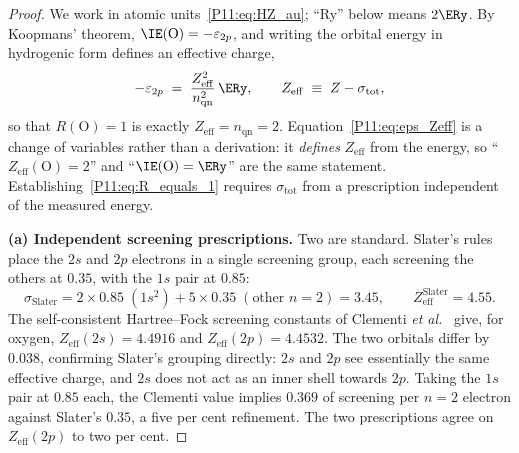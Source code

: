 

\begin{proof}
We work in atomic units~\eqref{P11:eq:HZ_au}; ``Ry'' below means $2\ERy$.
By Koopmans' theorem, $\IE(\mathrm{O}) = -\varepsilon_{2p}$, and writing
the orbital energy in hydrogenic form defines an effective charge,
\begin{equation}
  -\varepsilon_{2p}
  \;=\; \frac{Z_\mathrm{eff}^2}{n_\mathrm{qn}^2}\,\ERy,
  \qquad
  Z_\mathrm{eff} \;\equiv\; Z - \sigma_\mathrm{tot},
  \label{P11:eq:eps_Zeff}
\end{equation}
so that $R(\mathrm{O})=1$ is exactly $Z_\mathrm{eff}=n_\mathrm{qn}=2$.
Equation~\eqref{P11:eq:eps_Zeff} is a change of variables rather than a
derivation: it \emph{defines} $Z_\mathrm{eff}$ from the energy, so
``$Z_\mathrm{eff}(\mathrm{O})=2$'' and ``$\IE(\mathrm{O})=\ERy$'' are
the same statement.  Establishing~\eqref{P11:eq:R_equals_1} requires
$\sigma_\mathrm{tot}$ from a prescription independent of the measured
energy.

\textbf{(a) Independent screening prescriptions.}
Two are standard.  Slater's rules~\cite{Slater1930} place the $2s$ and
$2p$ electrons in a single screening group, each screening the others
at $0.35$, with the $1s$ pair at $0.85$:
\begin{equation}
  \sigma_\mathrm{Slater}
  = 2\times0.85\;(1s^2) + 5\times0.35\;(\text{other } n{=}2)
  = 3.45,
  \qquad
  Z_\mathrm{eff}^\mathrm{Slater} = 4.55 .
  \label{P11:eq:sigma_slater}
\end{equation}
The self-consistent Hartree--Fock screening constants of Clementi
\emph{et al.}~\cite{Clementi1963} give, for oxygen,
$Z_\mathrm{eff}(2s)=4.4916$ and $Z_\mathrm{eff}(2p)=4.4532$.  The two
orbitals differ by $0.038$, confirming Slater's grouping directly: $2s$
and $2p$ see essentially the same effective charge, and $2s$ does not
act as an inner shell towards $2p$.  Taking the $1s$ pair at $0.85$
each, the Clementi value implies $0.369$ of screening per $n=2$
electron against Slater's $0.35$, a five per cent refinement.  The two
prescriptions agree on $Z_\mathrm{eff}(2p)$ to two per cent.


\end{proof}
